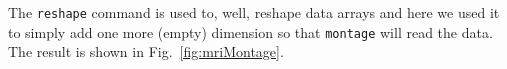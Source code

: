 The \lstinline{reshape} command is used to, well, reshape data arrays and here we used it to simply add one more (empty) dimension so that \lstinline{montage} will read the data.
The result is shown in Fig.~\ref{fig:mriMontage}.